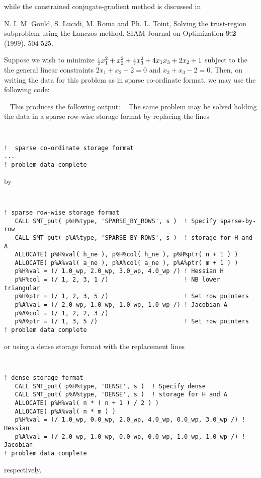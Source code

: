 \documentclass{galahad}
\begin{document}
\noindent
while the constrained conjugate-gradient method is discussed in
\vspace*{1mm}

\noindent  
N. I. M. Gould, S. Lucidi, M. Roma and Ph. L. Toint, 
Solving the trust-region subproblem using the Lanczos method. 
SIAM Journal on Optimization {\bf 9:2 } (1999), 504-525. 


\galexample
Suppose we wish to minimize
${\scriptstyle \frac{1}{2}} x_1^2 + x_2^2 + {\scriptstyle \frac{3}{2}} x_3^2 + 4 x_1 x_3 + 2 x_2 + 1$
subject to the the general linear constraints
$2 x_{1}  +  x_{2} - 2 = 0$ and
$x_{2} +  x_{3}  - 2 = 0$.
Then, on writing the data for this problem as
in sparse co-ordinate format,
we may use the following code:

{\tt \small
\VerbatimInput{\packageexample}
}
\noindent
This produces the following output:
{\tt \small
\VerbatimInput{\packageresults}
}
\noindent
The same problem may be solved holding the data in 
a sparse row-wise storage format by replacing the lines
{\tt \small
\begin{verbatim}
!  sparse co-ordinate storage format
...
! problem data complete   
\end{verbatim}
}
\noindent
by
{\tt \small
\begin{verbatim}
! sparse row-wise storage format
   CALL SMT_put( p%H%type, 'SPARSE_BY_ROWS', s )  ! Specify sparse-by-row
   CALL SMT_put( p%A%type, 'SPARSE_BY_ROWS', s )  ! storage for H and A
   ALLOCATE( p%H%val( h_ne ), p%H%col( h_ne ), p%H%ptr( n + 1 ) )
   ALLOCATE( p%A%val( a_ne ), p%A%col( a_ne ), p%A%ptr( m + 1 ) )
   p%H%val = (/ 1.0_wp, 2.0_wp, 3.0_wp, 4.0_wp /) ! Hessian H
   p%H%col = (/ 1, 2, 3, 1 /)                     ! NB lower triangular
   p%H%ptr = (/ 1, 2, 3, 5 /)                     ! Set row pointers
   p%A%val = (/ 2.0_wp, 1.0_wp, 1.0_wp, 1.0_wp /) ! Jacobian A
   p%A%col = (/ 1, 2, 2, 3 /)
   p%A%ptr = (/ 1, 3, 5 /)                        ! Set row pointers  
! problem data complete   
\end{verbatim}
}
\noindent
or using a dense storage format with the replacement lines
{\tt \small
\begin{verbatim}
! dense storage format
   CALL SMT_put( p%H%type, 'DENSE', s )  ! Specify dense
   CALL SMT_put( p%A%type, 'DENSE', s )  ! storage for H and A
   ALLOCATE( p%H%val( n * ( n + 1 ) / 2 ) )
   ALLOCATE( p%A%val( n * m ) )
   p%H%val = (/ 1.0_wp, 0.0_wp, 2.0_wp, 4.0_wp, 0.0_wp, 3.0_wp /) ! Hessian
   p%A%val = (/ 2.0_wp, 1.0_wp, 0.0_wp, 0.0_wp, 1.0_wp, 1.0_wp /) ! Jacobian
! problem data complete   
\end{verbatim}
}
\noindent
respectively.
\end{document}
